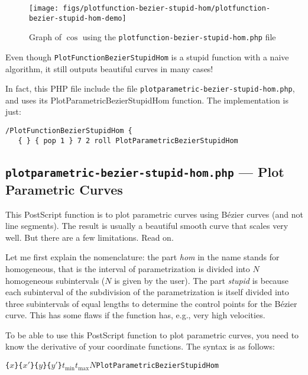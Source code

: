 \documentclass[10pt,a4paper]{scrartcl}
\newcommand\PS{PostScript}
\begin{document}
\begin{figure}[ht!]%
\centering
\texttt{[image: figs/plotfunction-bezier-stupid-hom/plotfunction-bezier-stupid-hom-demo]}%
\caption{Graph of $\cos$ using the \texttt{plotfunction-bezier-stupid-hom.php} file}%
\label{fig:plotfunction-bezier-stupid-hom-demo}%
\end{figure}

Even though \texttt{PlotFunctionBezierStupidHom} is a stupid function with a
naive algorithm, it still outputs beautiful curves in many cases!

In fact, this PHP file include the file \texttt{plotparametric-bezier-stupid-hom.php},
and uses its PlotParametricBezierStupidHom function. The implementation is just:
\begin{lstlisting}
/PlotFunctionBezierStupidHom {
   { } { pop 1 } 7 2 roll PlotParametricBezierStupidHom
\end{lstlisting}

\subsection{\texttt{plotparametric-bezier-stupid-hom.php} --- Plot Parametric Curves}
\label{ssec:plotparametric-bezier-stupid-hom.php}
This \PS{} function is to plot parametric curves using B\'ezier curves (and not
line segments). The result is usually a beautiful smooth curve that scales very
well. But there are a few limitations. Read on.

Let me first explain the nomenclature: the part \emph{hom} in the name stands
for homogeneous, that is the interval of parametrization is divided into $N$
homogeneous subintervals ($N$ is given by the user). The part \emph{stupid} is
because each subinterval of the subdivision of the parametrization is itself
divided into three subintervals of equal lengths to determine the control
points for the B\'ezier curve. This has some flaws if the function has, e.g.,
very high velocities.

To be able to use this \PS{} function to plot parametric curves, you need to
know the derivative of your coordinate functions. The syntax is as follows:
\begin{center}
\texttt{\{}$x$\texttt{\}}\quad\texttt{\{}$x'$\texttt{\}}\quad\texttt{\{}$y$\texttt{\}}\quad\texttt{\{}$y'$\texttt{\}}\quad$t_{\text{min}}$\quad$t_{\text{max}}$\quad$N$\quad\texttt{PlotParametricBezierStupidHom}
\end{center}
\end{document}
